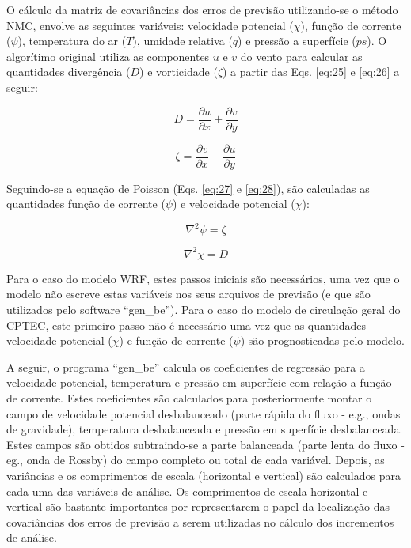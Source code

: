 O cálculo da matriz de covariâncias dos erros de previsão utilizando-se o método NMC, envolve as seguintes variáveis: velocidade potencial ($\chi$), função de corrente ($\psi$), temperatura do ar ($T$), umidade relativa ($q$) e pressão a superfície ($ps$). O algorítimo original utiliza as componentes $u$ e $v$ do vento para calcular as quantidades divergência ($D$) e vorticidade ($\zeta$) a partir das Eqs. \ref{eq:25} e \ref{eq:26} a seguir:

\begin{equation}
\label{eq:25}
D=\frac{\partial u}{\partial x} + \frac{\partial v}{\partial y}
\end{equation}

\begin{equation}
\label{eq:26}
\zeta=\frac{\partial v}{\partial x} - \frac{\partial u}{\partial y}
\end{equation}

Seguindo-se a equação de Poisson (Eqs. \ref{eq:27} e \ref{eq:28}), são calculadas as quantidades função de corrente ($\psi$) e velocidade potencial ($\chi$):

\begin{equation}
\label{eq:27}
\nabla^{2}{\psi}=\zeta
\end{equation}

\begin{equation}
\label{eq:28}
\nabla^{2}{\chi}=D
\end{equation}

Para o caso do modelo WRF, estes passos iniciais são necessários, uma vez que o modelo não escreve estas variáveis nos seus arquivos de previsão (e que são utilizados pelo software ``gen\_be''). Para o caso do modelo de circulação geral do CPTEC, este primeiro passo não é necessário uma vez que as quantidades velocidade potencial ($\chi$) e função de corrente ($\psi$) são prognosticadas pelo modelo. 

A seguir, o programa ``gen\_be'' calcula os coeficientes de regressão para a velocidade potencial, temperatura e pressão em superfície com relação a função de corrente. Estes coeficientes são calculados para posteriormente montar o campo de velocidade potencial desbalanceado (parte rápida do fluxo - e.g., ondas de gravidade), temperatura desbalanceada e pressão em superfície desbalanceada. Estes campos são obtidos subtraindo-se a parte balanceada (parte lenta do fluxo - eg., onda de Rossby) do campo completo ou total de cada variável. Depois, as variâncias e os comprimentos de escala (horizontal e vertical) são calculados para cada uma das variáveis de análise. Os comprimentos de escala horizontal e vertical são bastante importantes por representarem o papel da localização das covariâncias dos erros de previsão a serem utilizadas no cálculo dos incrementos de análise.

